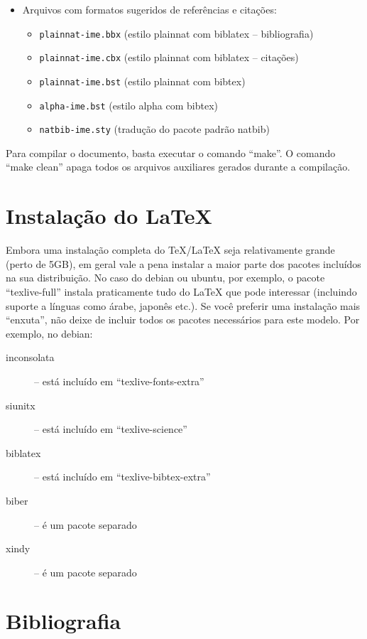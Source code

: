 \begin{itemize}
  \item Arquivos com formatos sugeridos de referências e citações:
  \begin{itemize}
    \item \texttt{plainnat-ime.bbx} (estilo plainnat com biblatex -- bibliografia)
    \item \texttt{plainnat-ime.cbx} (estilo plainnat com biblatex -- citações)
    \item \texttt{plainnat-ime.bst} (estilo plainnat com bibtex)
    \item \texttt{alpha-ime.bst} (estilo alpha com bibtex)
    \item \texttt{natbib-ime.sty} (tradução do pacote padrão natbib)
  \end{itemize}
\end{itemize}

Para compilar o documento, basta executar o comando ``make''. O comando ``make
clean'' apaga todos os arquivos auxiliares gerados durante a compilação.

\section{Instalação do \LaTeX{}}

Embora uma instalação completa do \TeX{}/\LaTeX{} seja relativamente grande (perto
de 5GB), em geral vale a pena instalar a maior parte dos pacotes incluídos
na sua distribuição. No caso do debian ou ubuntu, por exemplo, o pacote
``texlive-full'' instala praticamente tudo do \LaTeX{} que pode interessar (incluindo
suporte a línguas como árabe, japonês etc.). Se você preferir uma instalação mais
``enxuta'', não deixe de incluir todos os pacotes necessários para este modelo.
Por exemplo, no debian:

\begin{description}
  \item[inconsolata] -- está incluído em ``texlive-fonts-extra''
  \item [siunitx] -- está incluído em ``texlive-science''
  \item [biblatex] -- está incluído em ``texlive-bibtex-extra''
  \item [biber] -- é um pacote separado
  \item [xindy] -- é um pacote separado
\end{description}

\section{Bibliografia}


